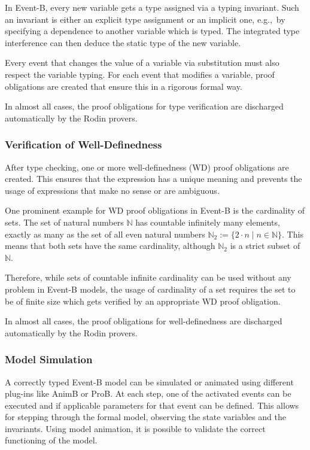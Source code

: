 In Event-B, every new variable gets a type assigned via a typing invariant. Such
an invariant is either an explicit type assignment or an implicit one, e.g.,\ by
specifying a dependence to another variable which is typed. The integrated type
interference can then deduce the static type of the new variable.

Every event that changes the value of a variable via substitution must also
respect the variable typing. For each event that modifies a variable,  proof
obligations are created that ensure this in a rigorous formal way.

In almost all cases, the proof obligations for type verification are discharged
automatically by the Rodin provers.

\subsubsection{Verification of Well-Definedness}
\label{sec:verif-well-defin}

After type checking, one or more well-definedness (WD) proof obligations are
created. This ensures that the expression has a unique meaning and prevents the
usage of expressions that make no sense or are ambiguous.

One prominent example for WD proof obligations in Event-B is the cardinality of
sets. The set of natural numbers $\mathbb{N}$ has countable infinitely many
elements, exactly as many as the set of all even natural numbers
$\mathbb{N}_2:=\{2\cdot n \mid n \in \mathbb{N}\}$. This means that both sets
have the same cardinality, although $\mathbb{N}_2$ is a strict subset of
$\mathbb{N}$.

Therefore, while sets of countable infinite cardinality can be used without any
problem in Event-B models, the usage of cardinality of a set requires the set to
be of finite size which gets verified by an appropriate WD proof obligation.

In almost all cases, the proof obligations for well-definedness are discharged
automatically by the Rodin provers.


\subsubsection{Model Simulation}
\label{sec:model-simulation}

A correctly typed Event-B model can be simulated or animated using different
plug-ins like AnimB or ProB. At each step, one of the activated events can be
executed and if applicable parameters for that event can be defined. This allows
for stepping through the formal model, observing the state variables and the
invariants. Using model animation, it is possible to validate the correct
functioning of the model.

